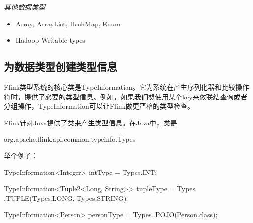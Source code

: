 \documentclass[cn,11pt,chinese]{elegantbook}
\newenvironment{Shaded}{}{}
\newcommand{\BuiltInTok}[1]{#1}
\newcommand{\FunctionTok}[1]{\textcolor[rgb]{0.02,0.16,0.49}{#1}}
\newcommand{\NormalTok}[1]{#1}
\providecommand{\tightlist}{%
  \setlength{\itemsep}{0pt}\setlength{\parskip}{0pt}}
\begin{document}
\emph{其他数据类型}

\begin{itemize}
\tightlist
\item
  Array, ArrayList, HashMap, Enum
\item
  Hadoop Writable types
\end{itemize}

\hypertarget{ux4e3aux6570ux636eux7c7bux578bux521bux5efaux7c7bux578bux4fe1ux606f}{%
\subsection{为数据类型创建类型信息}\label{ux4e3aux6570ux636eux7c7bux578bux521bux5efaux7c7bux578bux4fe1ux606f}}

Flink类型系统的核心类是TypeInformation。它为系统在产生序列化器和比较操作符时，提供了必要的类型信息。例如，如果我们想使用某个key来做联结查询或者分组操作，TypeInformation可以让Flink做更严格的类型检查。

Flink针对Java提供了类来产生类型信息。在Java中，类是

\begin{Shaded}
\begin{Highlighting}[]
\NormalTok{org.}\FunctionTok{apache}\NormalTok{.}\FunctionTok{flink}\NormalTok{.}\FunctionTok{api}\NormalTok{.}\FunctionTok{common}\NormalTok{.}\FunctionTok{typeinfo}\NormalTok{.}\FunctionTok{Types}
\end{Highlighting}
\end{Shaded}

举个例子：

\begin{Shaded}
\begin{Highlighting}[]
\NormalTok{TypeInformation\textless{}}\BuiltInTok{Integer}\NormalTok{\textgreater{} intType = }\BuiltInTok{Types}\NormalTok{.}\FunctionTok{INT}\NormalTok{;}

\NormalTok{TypeInformation\textless{}Tuple2\textless{}}\BuiltInTok{Long}\NormalTok{, }\BuiltInTok{String}\NormalTok{\textgreater{}\textgreater{} tupleType = }\BuiltInTok{Types}
\NormalTok{  .}\FunctionTok{TUPLE}\NormalTok{(}\BuiltInTok{Types}\NormalTok{.}\FunctionTok{LONG}\NormalTok{, }\BuiltInTok{Types}\NormalTok{.}\FunctionTok{STRING}\NormalTok{);}

\NormalTok{TypeInformation\textless{}Person\textgreater{} personType = }\BuiltInTok{Types}
\NormalTok{  .}\FunctionTok{POJO}\NormalTok{(Person.}\FunctionTok{class}\NormalTok{);}
\end{Highlighting}
\end{Shaded}
\end{document}
